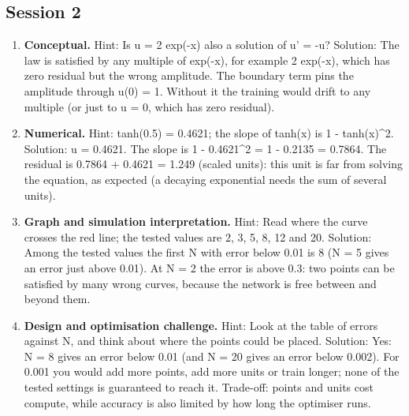 \documentclass[11pt,a4paper]{article}
\begin{document}
\subsection*{Session 2}
\begin{enumerate}[nosep]
\item \textbf{Conceptual.} Hint: Is u = 2 exp(-x) also a solution of u' = -u? Solution: The law is satisfied by any multiple of exp(-x), for example 2 exp(-x), which has zero residual but the wrong amplitude. The boundary term pins the amplitude through u(0) = 1. Without it the training would drift to any multiple (or just to u = 0, which has zero residual).
\item \textbf{Numerical.} Hint: tanh(0.5) = 0.4621; the slope of tanh(x) is 1 - tanh(x)\textasciicircum{}2. Solution: u = 0.4621. The slope is 1 - 0.4621\textasciicircum{}2 = 1 - 0.2135 = 0.7864. The residual is 0.7864 + 0.4621 = 1.249 (scaled units): this unit is far from solving the equation, as expected (a decaying exponential needs the sum of several units).
\item \textbf{Graph and simulation interpretation.} Hint: Read where the curve crosses the red line; the tested values are 2, 3, 5, 8, 12 and 20. Solution: Among the tested values the first N with error below 0.01 is 8 (N = 5 gives an error just above 0.01). At N = 2 the error is above 0.3: two points can be satisfied by many wrong curves, because the network is free between and beyond them.
\item \textbf{Design and optimisation challenge.} Hint: Look at the table of errors against N, and think about where the points could be placed. Solution: Yes: N = 8 gives an error below 0.01 (and N = 20 gives an error below 0.002). For 0.001 you would add more points, add more units or train longer; none of the tested settings is guaranteed to reach it. Trade-off: points and units cost compute, while accuracy is also limited by how long the optimiser runs.
\end{enumerate}
\end{document}
